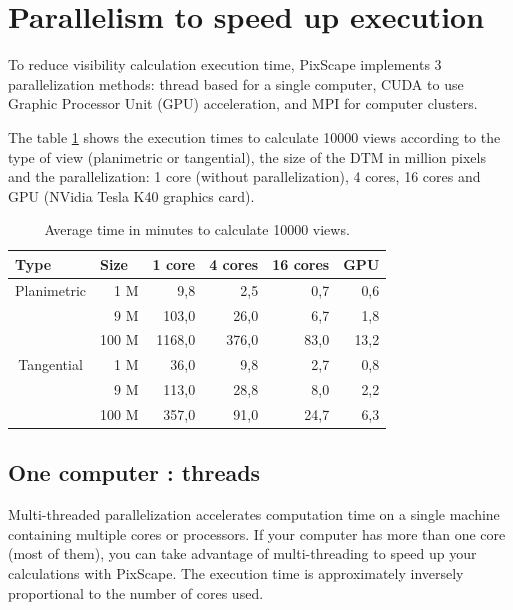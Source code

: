 \documentclass{report}
\begin{document}
\section{Parallelism to speed up execution}
\label{parallelism}
To reduce visibility calculation execution time, PixScape implements 3 parallelization methods: thread based for a single computer, CUDA to use Graphic Processor Unit (GPU) acceleration, and MPI for computer clusters.

The table \ref{perf_table} shows the execution times to calculate 10000 views according to the type of view (planimetric or tangential), the size of the DTM in million pixels and the parallelization: 1 core (without parallelization), 4 cores, 16 cores and GPU (NVidia Tesla K40 graphics card).

\begin{table}[htbp]
	
	\begin{tabular}{|l|r|r|r|r|r|}
		\hline
		Type & \multicolumn{1}{l|}{Size} & \multicolumn{1}{l|}{1 core} & \multicolumn{1}{l|}{4 cores} & \multicolumn{1}{l|}{16 cores} & \multicolumn{1}{l|}{GPU} \\ \hline
		\multicolumn{ 1}{|c|}{Planimetric} & 1 M & 9,8 & 2,5 & 0,7 & 0,6 \\ \cline{ 2- 6}
		\multicolumn{ 1}{|l|}{} & 9 M & 103,0 & 26,0 & 6,7 & 1,8 \\ \cline{ 2- 6}
		\multicolumn{ 1}{|l|}{} & 100 M & 1168,0 & 376,0 & 83,0 & 13,2 \\ \hline
		\multicolumn{ 1}{|c|}{Tangential} & 1 M & 36,0 & 9,8 & 2,7 & 0,8 \\ \cline{ 2- 6}
		\multicolumn{ 1}{|l|}{} & 9 M & 113,0 & 28,8 & 8,0 & 2,2 \\ \cline{ 2- 6}
		\multicolumn{ 1}{|l|}{} & 100 M & 357,0 & 91,0 & 24,7 & 6,3 \\ \hline
	\end{tabular}
	\caption{Average time in minutes to calculate 10000 views.}
	\label{perf_table}
\end{table}


\subsection{One computer : threads}
\label{thread}
Multi-threaded parallelization accelerates computation time on a single machine containing multiple cores or processors. If your computer has more than one core (most of them), you can take advantage of multi-threading to speed up your calculations with PixScape. The execution time is approximately inversely proportional to the number of cores used. 
\end{document}
